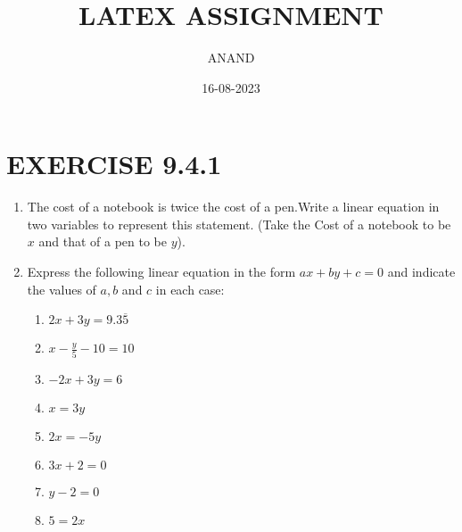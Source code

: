 \documentclass[10pt]{article}
\begin{document}
\title{LATEX ASSIGNMENT}
\author{ANAND}
\date{16-08-2023}
\maketitle
\section*{EXERCISE 9.4.1}
\begin{enumerate}[label=\arabic*.,ref=\theenumi]
\item The cost of a notebook is twice the cost of a pen.Write a linear
equation in two variables to represent this statement.
(Take the Cost of a notebook to be $x$ and that of a pen to be
$y$).
\item Express the following linear equation in the form $ax+by+c=0$
and indicate the values of $a,b$ and $c$ in each case:
\begin{enumerate}[label=(\roman*),ref=\theenumi]
\item $2x+3y=9.3\overline{5}$
\item $x-\frac{y}{5}-10=10$
\item $-2x+3y=6$
\item $ x=3y$
\item $2x=-5y$
\item $3x+2=0$
\item $y-2=0$
\item $5=2x$
\end{enumerate}
\end{enumerate}
\end{document}
